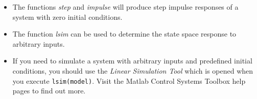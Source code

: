 \begin{slide}
\begin{itemize}
	\item The functions \emph{step} and \emph{impulse} will produce step impulse responses of a system with zero initial conditions.
	\item The function \emph{lsim} can be used to determine the state space response to arbitrary inputs.
	\item If you need to simulate a system with arbitrary inputs and predefined initial conditions, you should use the \emph{Linear Simulation Tool} which is opened when you execute \texttt{lsim(model)}.
	Visit the Matlab Control Systems Toolbox help pages to find out more.
\end{itemize}
\end{slide}


